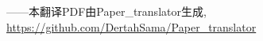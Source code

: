 \documentclass[utf8]{ctexart}
\title{}
\author{Author1, Author2}
\date{\paperref}
\newcommand\mainskip{-5pt}
\begin{document}
\begin{sloppypar}
\allowdisplaybreaks[3]  
\setlength{\abovedisplayskip}{-6pt}
\setlength{\belowdisplayskip}{10pt}
\setlength{\abovedisplayshortskip}{0pt}
\setlength{\belowdisplayshortskip}{0pt}
\setlength{\parskip}{\mainskip}

	\maketitle



\setlength{\parskip}{0pt} \small %


\end{sloppypar}	
\begin{flushright}
	\vfill \footnotesize
	——本翻译PDF由Paper_translator生成, \url{https://github.com/DertahSama/Paper_translator}
\end{flushright}
\end{document}
